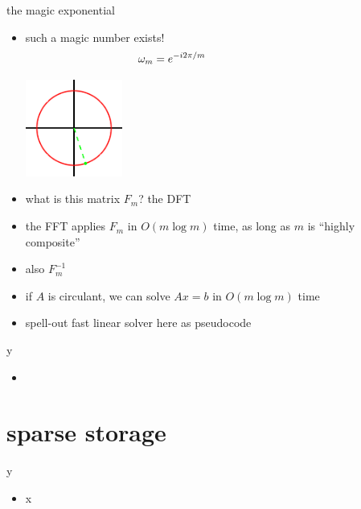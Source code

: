 \documentclass[10pt,
               svgnames,
               hyperref={colorlinks,citecolor=DeepPink4,linkcolor=FireBrick,urlcolor=Maroon},
               usepdftitle=false]{beamer}
\begin{document}
\begin{frame}{the magic exponential}

\begin{itemize}
\item such a magic number exists!
{\large
    $$\omega_m = e^{-i 2\pi/m} \hspace{30mm}$$
}

\vspace{-20mm}
\hfill \includegraphics[width=0.25\textwidth]{images/magic5.png}
\item what is this matrix $F_m$? the DFT
\item the FFT applies $F_m$ in $O(m\log m)$ time, as long as $m$ is ``highly composite''
\item also $F_m^{-1}$
\item if $A$ is circulant, we can solve $Ax=b$ in $O(m\log m)$ time
\item spell-out fast linear solver here as pseudocode
\end{itemize}
\end{frame}


\begin{frame}{y}

\begin{itemize}
\item 
\end{itemize}
\end{frame}


\section{sparse storage}

\begin{frame}{y}

\begin{itemize}
\item x
\end{itemize}
\end{frame}
\end{document}
